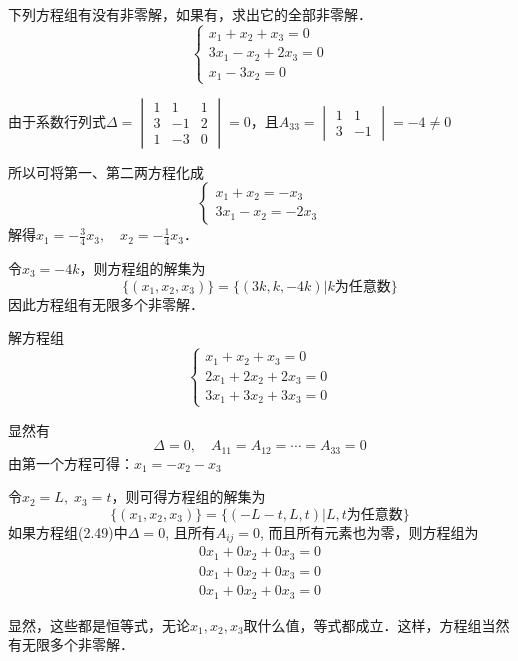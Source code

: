 \begin{example}
下列方程组有没有非零解，如果有，求出它的全部非零解．
\[\begin{cases}
    x_1+x_2+x_3=0\\ 3x_1-x_2+2x_3=0\\ x_1-3x_2=0
\end{cases}\]
\end{example}

\begin{solution}
    由于系数行列式$\Delta=\begin{vmatrix}
        1&1&1\\3&-1&2\\1&-3&0
    \end{vmatrix}=0$，且$A_{33}=\begin{vmatrix}
        1&1\\3&-1
    \end{vmatrix}=-4\ne 0$

所以可将第一、第二两方程化成
\[\begin{cases}
    x_1+x_2=-x_3\\
    3x_1-x_2=-2x_3
\end{cases}\]
解得$x_1=-\frac{3}{4}x_3,\quad x_2=-\frac{1}{4}x_3$．

令$x_3=-4k$，则方程组的解集为
\[\{(x_1,x_2,x_3)\}=\{(3k,k,-4k)|\text{$k$为任意数}\}\]
因此方程组有无限多个非零解．
\end{solution}

\begin{example}
解方程组\[\begin{cases}
    x_1+x_2+x_3=0\\
    2x_1+2x_2+2x_3=0\\
    3x_1+3x_2+3x_3=0
\end{cases}\]
\end{example}

\begin{solution}
显然有
\[\Delta=0,\quad A_{11}=A_{12}=\cdots=A_{33}=0\]
由第一个方程可得：$x_1=-x_2-x_3$

令$x_2=L,\; x_3=t$，则可得方程组的解集为
\[\{(x_1,x_2,x_3)\}=\{(-L-t,L,t)|\text{$L,t$为任意数}\}\]
如果方程组(2.49)中$\Delta=0$, 且所有$A_{ij}=0$, 而且所有元素也为零，则方程组为
\[\begin{split}
   0x_1+0x_2+0x_3=0\\
   0x_1+0x_2+0x_3=0\\
   0x_1+0x_2+0x_3=0 
\end{split}\]

显然，这些都是恒等式，无论$x_1,x_2,x_3$取什么值，等式都成立．这样，方程组当然有无限多个非零解．
\end{solution}

